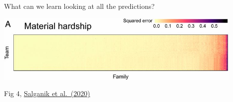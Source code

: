 \documentclass[aspectratio=169]{beamer}
\begin{document}
\begin{frame}

\begin{center}
\Large{What can we learn looking at all the predictions?}
\end{center}

\end{frame}
\begin{frame}

\begin{center}
\includegraphics[width=0.90\textwidth]{figures/salganik_measuring_2020_fig4a}
\end{center}

\vfill
Fig 4, \href{https://doi.org/10.1073/pnas.1915006117}{Salganik et al.\ (2020)}
\end{frame}
\end{document}
